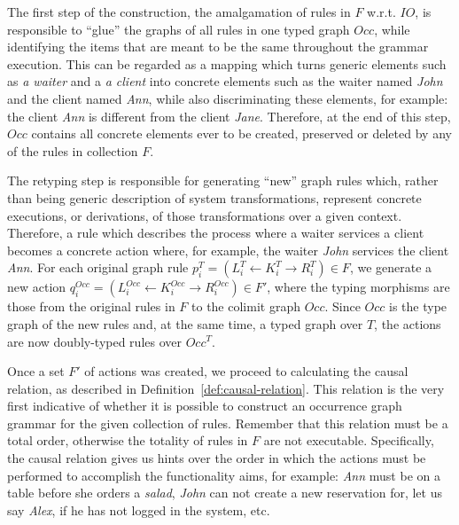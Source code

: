 The first step of the construction, the amalgamation of rules in $F$ w.r.t. $IO$, is responsible to ``glue'' the graphs of all rules in one typed graph $Occ$, while identifying the items that are meant to be the same throughout the grammar execution. This can be regarded as a mapping which turns generic elements such as \textit{a waiter} and a \textit{a client} into concrete elements such as the waiter named \textit{John} and the client named \textit{Ann}, while also discriminating these elements, for example: the client \textit{Ann} is different from the client \textit{Jane}. Therefore, at the end of this step, $Occ$ contains all concrete elements ever to be created, preserved or deleted by any of the rules in collection $F$.

The retyping step is responsible for generating ``new'' graph rules which, rather than being generic description of system transformations, represent concrete executions, or derivations, of those transformations over a given context. Therefore, a rule which describes the process where a waiter services a client becomes a concrete action where, for example, the waiter \textit{John} services the client \textit{Ann}.
For each original graph rule $\mbox{$p_i^{T} = \left(L_i^{T} \leftarrow K_i^{T} \rightarrow R_i^{T}\right)$} \in F$, we generate a new action \mbox{$q_i^{Occ} = \left(L_i^{Occ} \leftarrow K_i^{Occ} \rightarrow R_i^{Occ}\right) \in F'$}, where the typing morphisms are those from the original rules in $F$ to the colimit graph $Occ$. Since $Occ$ is the type graph of the new rules and, at the same time, a typed graph over $T$, the actions are now doubly-typed rules over $Occ^T$.


Once a set $F'$ of actions was created, we proceed to calculating the causal relation, as described in Definition~\ref{def:causal-relation}. This relation is the very first indicative of whether it is possible to construct an occurrence graph grammar for the given collection of rules. Remember that this relation must be a total order, otherwise the totality of rules in $F$ are not executable. Specifically, the causal relation gives us hints over the order in which the actions must be performed to accomplish the functionality aims, for example: \textit{Ann} must be on a table before she orders a \textit{salad}, \textit{John} can not create a new reservation for, let us say \textit{Alex}, if he has not logged in the system, etc.

